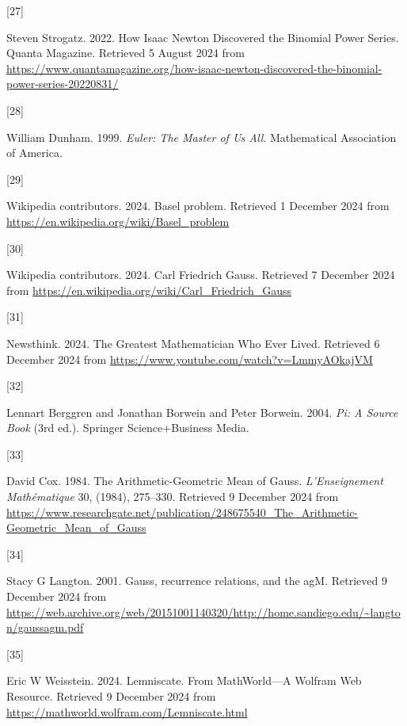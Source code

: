\documentclass[
  a4paper,
]{article}
\newlength{\cslhangindent}
\newlength{\csllabelwidth}
\newenvironment{CSLReferences}[2] %
 {\begin{list}{}{%
  \setlength{\itemindent}{0pt}
  \setlength{\leftmargin}{0pt}
  \setlength{\parsep}{0pt}
  \ifodd #1
   \setlength{\leftmargin}{\cslhangindent}
   \setlength{\itemindent}{-1\cslhangindent}
  \fi
  \setlength{\itemsep}{#2\baselineskip}}}
 {\end{list}}
\newcommand{\CSLLeftMargin}[1]{\parbox[t]{\csllabelwidth}{\strut#1\strut}}
\newcommand{\CSLRightInline}[1]{\parbox[t]{\linewidth - \csllabelwidth}{\strut#1\strut}}
\begin{document}
\begin{CSLReferences}{0}{0}
\CSLLeftMargin{{[}27{]} }%
\CSLRightInline{Steven Strogatz. 2022. {How Isaac Newton Discovered the
Binomial Power Series}. {Quanta Magazine}. Retrieved 5 August 2024 from
\url{https://www.quantamagazine.org/how-isaac-newton-discovered-the-binomial-power-series-20220831/}}

\CSLLeftMargin{{[}28{]} }%
\CSLRightInline{William Dunham. 1999. \emph{{Euler: The Master of Us
All}}. Mathematical Association of America.}

\CSLLeftMargin{{[}29{]} }%
\CSLRightInline{Wikipedia contributors. 2024. {Basel problem}. Retrieved
1 December 2024 from \url{https://en.wikipedia.org/wiki/Basel_problem}}

\CSLLeftMargin{{[}30{]} }%
\CSLRightInline{Wikipedia contributors. 2024. {Carl Friedrich Gauss}.
Retrieved 7 December 2024 from
\url{https://en.wikipedia.org/wiki/Carl_Friedrich_Gauss}}

\CSLLeftMargin{{[}31{]} }%
\CSLRightInline{Newsthink. 2024. {The Greatest Mathematician Who Ever
Lived}. Retrieved 6 December 2024 from
\url{https://www.youtube.com/watch?v=LmmyAOkajVM}}

\CSLLeftMargin{{[}32{]} }%
\CSLRightInline{Lennart Berggren and Jonathan Borwein and Peter Borwein.
2004. \emph{{Pi: A Source Book}} (3rd ed.). Springer Science+Business
Media.}

\CSLLeftMargin{{[}33{]} }%
\CSLRightInline{David Cox. 1984. {The Arithmetic-Geometric Mean of
Gauss}. \emph{L'Enseignement Mathématique} 30, (1984), 275--330.
Retrieved 9 December 2024 from
\url{https://www.researchgate.net/publication/248675540_The_Arithmetic-Geometric_Mean_of_Gauss}}

\CSLLeftMargin{{[}34{]} }%
\CSLRightInline{Stacy G Langton. 2001. {Gauss, recurrence relations, and
the agM}. Retrieved 9 December 2024 from
\url{https://web.archive.org/web/20151001140320/http://home.sandiego.edu/~langton/gaussagm.pdf}}

\CSLLeftMargin{{[}35{]} }%
\CSLRightInline{Eric W Weisstein. 2024. {Lemniscate}. {From
MathWorld---A Wolfram Web Resource}. Retrieved 9 December 2024 from
\url{https://mathworld.wolfram.com/Lemniscate.html}}


\end{CSLReferences}
\end{document}
